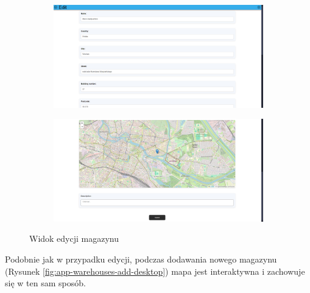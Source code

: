 \documentclass[../main.tex]{subfiles}
\begin{document}
            \begin{figure}[H]
                \begin{subfigure}{.49\textwidth}
                    \centering
                    \includegraphics[width=\getImageWidth]{images/app-desktop/app-warehouses-edit1-desktop.png}
                    \label{fig:app-warehouses-edit1-desktop}
                \end{subfigure}
                \begin{subfigure}{.49\textwidth}
                    \centering
                    \includegraphics[width=\getImageWidth]{images/app-desktop/app-warehouses-edit2-desktop.png}
                    \label{fig:app-warehouses-edit2-desktop}
                \end{subfigure}
                \caption{Widok edycji magazynu}
                \label{fig:app-warehouses-edit-desktop}
            \end{figure}

            Podobnie jak w przypadku edycji, podczas dodawania nowego magazynu (Rysunek \ref{fig:app-warehouses-add-desktop}) mapa jest interaktywna i zachowuje się w ten sam sposób.
\end{document}
